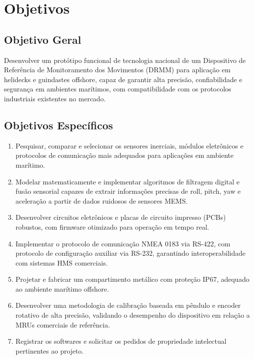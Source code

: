 \documentclass[a4paper, 12pt]{article}
\begin{document}
\newpage
\section{Objetivos}

\subsection{Objetivo Geral}
    Desenvolver um protótipo funcional de tecnologia nacional de um Dispositivo de Referência de Monitoramento dos Movimentos (DRMM) para aplicação em helidecks e guindastes offshore, capaz de garantir alta precisão, confiabilidade e segurança em ambientes marítimos, com compatibilidade com os protocolos industriais existentes no mercado.

\subsection{Objetivos Específicos}

    \begin{enumerate}
        \item Pesquisar, comparar e selecionar os sensores inerciais, módulos eletrônicos e protocolos de comunicação mais adequados para aplicações em ambiente marítimo.

        \item Modelar matematicamente e implementar algoritmos de filtragem digital e fusão sensorial capazes de extrair informações precisas de roll, pitch, yaw e aceleração a partir de dados ruidosos de sensores MEMS.

        \item Desenvolver circuitos eletrônicos e placas de circuito impresso (PCBs) robustos, com firmware otimizado para operação em tempo real.

        \item Implementar o protocolo de comunicação NMEA 0183 via RS-422, com protocolo de configuração auxiliar via RS-232, garantindo interoperabilidade com sistemas HMS comerciais.

        \item Projetar e fabricar um compartimento metálico com proteção IP67, adequado ao ambiente marítimo offshore.

        \item Desenvolver uma metodologia de calibração baseada em pêndulo e encoder rotativo de alta precisão, validando o desempenho do dispositivo em relação a MRUs comerciais de referência.

        \item Registrar os softwares e solicitar os pedidos de propriedade intelectual pertinentes ao projeto.
    \end{enumerate}
\end{document}
